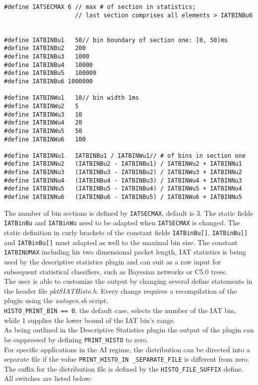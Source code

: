 \documentclass[documentation]{subfiles}
\begin{document}
\begin{lstlisting}
#define IATSECMAX 6 // max # of section in statistics;
                    // last section comprises all elements > IATBINBu6


#define IATBINBu1   50// bin boundary of section one: [0, 50)ms
#define IATBINBu2   200
#define IATBINBu3   1000
#define IATBINBu4   10000
#define IATBINBu5   100000
#define IATBINBu6 1000000

#define IATBINWu1   10// bin width 1ms
#define IATBINWu2   5
#define IATBINWu3   10
#define IATBINWu4   20
#define IATBINWu5   50
#define IATBINWu6   100

#define IATBINNu1   IATBINBu1 / IATBINWu1// # of bins in section one
#define IATBINNu2   (IATBINBu2 - IATBINBu1) / IATBINWu2 + IATBINNu1
#define IATBINNu3   (IATBINBu3 - IATBINBu2) / IATBINWu3 + IATBINNu2
#define IATBINNu4   (IATBINBu4 - IATBINBu3) / IATBINWu4 + IATBINNu3
#define IATBINNu5   (IATBINBu5 - IATBINBu4) / IATBINWu5 + IATBINNu4
#define IATBINNu6   (IATBINBu6 - IATBINBu5) / IATBINWu6 + IATBINNu5

\end{lstlisting}

The number of bin sections is defined by {\tt IATSECMAX}, default is 3. The static fields {\tt IATBinBu} and {\tt IATBinWu}
need to be adapted when {\tt IATSECMAX} is changed. The static definition in curly brackets of the constant fields
{\tt IATBinBu[]}, {\tt IATBinBu[]} and {\tt IATBinBu[]} must adapted as well to the maximal bin size. The constant {\tt IATBINUMAX}
including his two dimensional packet length, IAT statistics is being used by the descriptive statistics plugin
and can suit as a raw input for subsequent statistical classifiers, such as Bayesian networks or C5.0 trees. \\

The user is able to customize the output by changing several define statements in the header file {\em pktSIATHisto.h}. Every change requires a recompilation of the plugin using the {\em autogen.sh} script.\\
{\tt HISTO\_PRINT\_BIN == 0}, the default case, selects the number of the IAT bin, while 1 supplies the lower bound of the IAT bin's range.\\
As being outlined in the Descriptive Statistics plugin the output of the plugin can be suppressed by defining {\tt PRINT\_HISTO} to zero.\\
For specific applications in the AI regime, the distribution can be directed into a separate file if the value {\tt PRINT\_HISTO\_IN \_SEPARATE\_FILE} is different from zero. The suffix for the distribution file is defined by the {\tt HISTO\_FILE\_SUFFIX} define. All switches are listed below:
\end{document}
